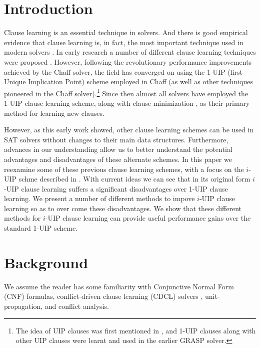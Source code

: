 \documentclass[runningheads]{llncs}
\begin{document}
\section{Introduction}
Clause learning is an essential technique in \sat solvers. And there
is good empirical evidence that clause learning is, in fact, the most
important technique used in modern \sat solvers
\cite{DBLP:conf/sat/KatebiSS11}. In early \sat research a number of
different clause learning techniques were proposed
\cite{DBLP:conf/iccad/ZhangMMM01,DBLP:conf/iccad/SilvaS96,DBLP:journals/tc/Marques-SilvaS99,DBLP:conf/aaai/BayardoS97}.
However, following the revolutionary performance improvements achieved
by the Chaff \sat solver, the field has converged on using the 1-UIP
(first Unique Implication Point) scheme
\cite{DBLP:conf/iccad/ZhangMMM01} employed in Chaff
\cite{DBLP:conf/dac/MoskewiczMZZM01} (as well as other techniques
pioneered in the Chaff solver).\footnote{The idea of UIP clauses was
  first mentioned in \cite{DBLP:journals/tc/Marques-SilvaS99}, and
  1-UIP clauses along with other UIP clauses were learnt and used in
  the earlier GRASP \sat solver.} Since then almost all \sat solvers
have employed the 1-UIP clause learning scheme, along with clause
minimization \cite{DBLP:conf/sat/SorenssonB09}, as their primary
method for learning new clauses.

However, as this early work showed, other clause learning schemes can
be used in SAT solvers without changes to their main data
structures. Furthermore, advances in our understanding allow us to
better understand the potential advantages and disadvantages of these
alternate schemes. In this paper we reexamine some of these previous
clause learning schemes, with a focus on the $i$-UIP schme described
in \cite{DBLP:conf/iccad/ZhangMMM01}. With current ideas we can see
that in its original form $i$-UIP clause learning suffers a
significant disadvantages over 1-UIP clause learning. We present a
number of different methods to impove $i$-UIP clause learning so as to
over come these disadvantages. We show that these different methods
for $i$-UIP clause learning can provide useful performance gains over
the standard 1-UIP scheme.

\section{Background}
We assume the reader has some familiarity with Conjunctive Normal Form
(CNF) formulas, conflict-driven clause learning (CDCL) \sat solvers
\cite{DBLP:series/faia/SilvaLM09}, unit-propagation, and conflict
analysis.
\end{document}

